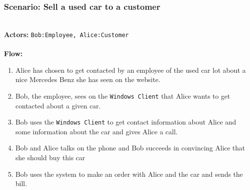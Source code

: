 \subsubsection{Scenario: Sell a used car to a customer}
\HRule \\[0.4cm]
\textbf{Actors:} \texttt{Bob:Employee, Alice:Customer}\\
\HRule \\[0.4cm]
\textbf{Flow:} \\
\begin{enumerate}
\item Alice has chosen to get contacted by an employee of the used car lot about a nice Mercedes Benz she has seen on the website.
\item Bob, the employee, sees on the \texttt{Windows Client} that Alice wants to get contacted about a given car.
\item Bob uses the \texttt{Windows Client} to get contact information about Alice and some information about the car and gives Alice a call.
\item Bob and Alice talks on the phone and Bob succeeds in convincing Alice that she should buy this car
\item Bob uses the system to make an order with Alice and the car and sends the bill.
\end{enumerate}
\HRule \\[0.4cm]
